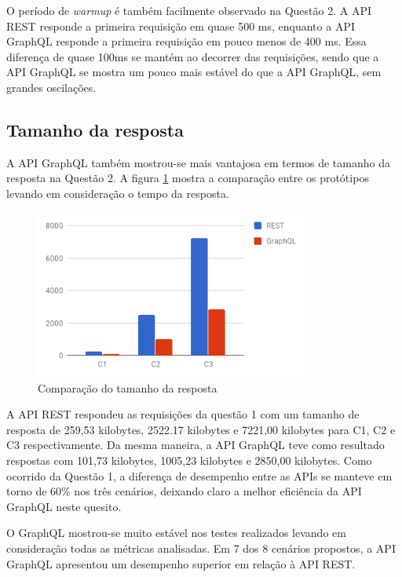O período de \textit{warmup} é também facilmente observado na Questão 2. A API REST responde a primeira requisição em quase 500 ms, enquanto a API GraphQL responde a primeira requisição em pouco menos de 400 ms. Essa diferença de quase 100ms se mantém ao decorrer das requisições, sendo que a API GraphQL se mostra um pouco mais estável do que a API GraphQL, sem grandes oscilações.

\subsection{Tamanho da resposta}

A API GraphQL também mostrou-se mais vantajosa em termos de tamanho da resposta na Questão 2. A figura \ref{fig:q2-size} mostra a comparação entre os protótipos levando em consideração o tempo da resposta.

\begin{figure}[htbp]
    \centering
    \includegraphics[width=0.8\textwidth]{figuras/q2-size.png}
    \caption{Comparação do tamanho da resposta}
    \label{fig:q2-size}
    \author{fonte: Autor}
\end{figure}

A API REST respondeu as requisições da questão 1 com um tamanho de resposta de 259,53 kilobytes, 2522.17 kilobytes e 7221,00 kilobytes para C1, C2 e C3 respectivamente. Da mesma maneira, a API GraphQL teve como resultado respostas com 101,73 kilobytes, 1005,23 kilobytes e 2850,00 kilobytes. Como ocorrido da Questão 1, a diferença de desempenho entre as APIs se manteve em torno de 60\% nos três cenários, deixando claro a melhor eficiência da API GraphQL neste quesito.

O GraphQL mostrou-se muito estável nos testes realizados levando em consideração todas as métricas analisadas. Em 7 dos 8 cenários propostos, a API GraphQL apresentou um desempenho superior em relação à API REST.